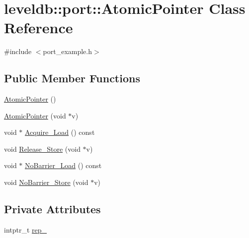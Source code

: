 \hypertarget{classleveldb_1_1port_1_1_atomic_pointer}{\section{leveldb\-:\-:port\-:\-:Atomic\-Pointer Class Reference}
\label{classleveldb_1_1port_1_1_atomic_pointer}
}


{\ttfamily \#include $<$port\-\_\-example.\-h$>$}

\subsection*{Public Member Functions}
\begin{DoxyCompactItemize}
\item 
\hyperlink{classleveldb_1_1port_1_1_atomic_pointer_a046bde8475164356d81353741b18a408}{Atomic\-Pointer} ()
\item 
\hyperlink{classleveldb_1_1port_1_1_atomic_pointer_aa8640431ad3d0ac2f0de62ef6090e89e}{Atomic\-Pointer} (void $\ast$v)
\item 
void $\ast$ \hyperlink{classleveldb_1_1port_1_1_atomic_pointer_a25b7cd07f114f6e59278d5523aff6140}{Acquire\-\_\-\-Load} () const 
\item 
void \hyperlink{classleveldb_1_1port_1_1_atomic_pointer_a8dfe51c125f71c09a363dae042be63a7}{Release\-\_\-\-Store} (void $\ast$v)
\item 
void $\ast$ \hyperlink{classleveldb_1_1port_1_1_atomic_pointer_ac11845e17d85f9de46b6c66979374f8f}{No\-Barrier\-\_\-\-Load} () const 
\item 
void \hyperlink{classleveldb_1_1port_1_1_atomic_pointer_aa7faab23777d1fe3c1a96d32a28ed20c}{No\-Barrier\-\_\-\-Store} (void $\ast$v)
\end{DoxyCompactItemize}
\subsection*{Private Attributes}
\begin{DoxyCompactItemize}
\item 
intptr\-\_\-t \hyperlink{classleveldb_1_1port_1_1_atomic_pointer_a3403f113d32302b77d328e53c6bafcb5}{rep\-\_\-}
\end{DoxyCompactItemize}


